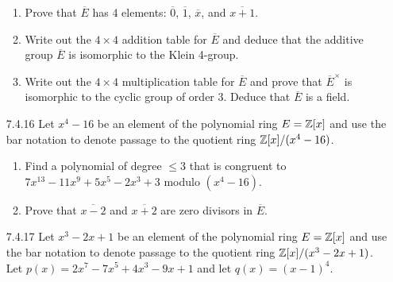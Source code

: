 \begin{enumerate}
\begin{enumerate}
                     \item Prove that $\overline{E}$ has 4 elements:
                           $\overline{0}$, $\overline{1}$, $\overline{x}$, and
                           $\overline{x+1}$.
                     \item Write out the $4 \times 4$ addition table for
                           $\overline{E}$ and deduce that the additive group
                           $\overline{E}$ is isomorphic to the Klein 4-group.
                     \item Write out the $4 \times 4$ multiplication table for
                           $\overline{E}$ and prove that $\overline{E}^\times$
                           is isomorphic to the cyclic group of order 3. Deduce
                           that $\overline{E}$ is a field.
                  \end{enumerate}
   \item[7.4.16]  Let $x^4 - 16$ be an element of the polynomial ring
                  $E = \mathbb{Z}[x]$ and use the bar notation to denote passage to the
                  quotient ring $\mathbb{Z}[x]/(x^4 - 16)$.
                  \begin{enumerate}
                     \item Find a polynomial of degree $\le 3$ that is congruent
                           to $7x^{13} - 11x^9 + 5x^5 - 2x^3 + 3$ modulo
                           $(x^4 - 16)$.
                     \item Prove that $\overline{x - 2}$ and $\overline{x + 2}$
                           are zero divisors in $\overline{E}$.
                  \end{enumerate}
   \item[7.4.17]  Let $x^3 - 2x + 1$ be an element of the polynomial ring
                  $E = \mathbb{Z}[x]$ and use the bar notation to denote passage to the
                  quotient ring $\mathbb{Z}[x]/(x^3 - 2x + 1)$. Let
                  $p(x) = 2x^7 - 7x^5 + 4x^3 - 9x + 1$ and let
                  $q(x) = (x - 1)^4$.
\end{enumerate}
